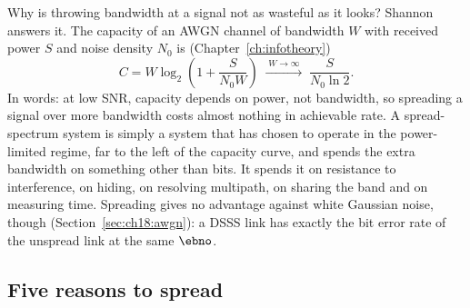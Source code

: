 Why is throwing bandwidth at a signal not as wasteful as it looks? Shannon answers it. The
capacity of an AWGN channel of bandwidth $W$ with received power $S$ and noise
density $N_0$ is (Chapter~\ref{ch:infotheory})
\begin{equation}
C=W\log_2\!\left(1+\frac{S}{N_0W}\right)\;\xrightarrow{\;W\to\infty\;}\;\frac{S}{N_0\ln2}.
\end{equation}
In words: at low SNR, capacity depends on power, not bandwidth, so spreading a signal over more
bandwidth costs almost nothing in achievable rate. A spread-spectrum system is simply a system that
has chosen to operate in the power-limited regime, far to the left of the capacity curve,
and spends the extra bandwidth on something other than bits. It spends it on resistance to
interference, on hiding, on resolving multipath, on sharing the band and on measuring time.
Spreading gives no advantage against white Gaussian noise, though
(Section~\ref{sec:ch18:awgn}): a DSSS link has exactly the bit error rate of the
unspread link at the same $\ebno$.


\subsection{Five reasons to spread}

